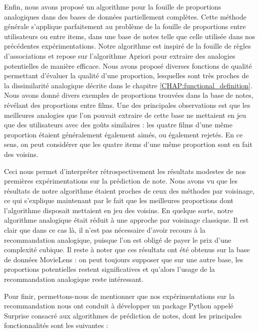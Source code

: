 Enfin, nous avons proposé un algorithme pour la fouille de proportions
analogiques dans des bases de données partiellement complètes. Cette méthode
générale s'applique parfaitement au problème de la fouille de proportions
entre utilisateurs ou entre items, dans une base de notes telle que
celle utilisée dans nos précédentes expérimentations. Notre algorithme est
inspiré de la fouille de règles d'associations et repose sur l'algorithme
Apriori pour extraire des analogies potentielles de manière efficace. Nous
avons proposé diverses fonctions de qualité permettant d'évaluer la qualité d'une
proportion, lesquelles sont très proches de la dissimilarité analogique décrite
dans le chapitre \ref{CHAP:functional_definition}. Nous avons donné divers
exemples de proportions trouvées dans la base de notes, révélant des
proportions entre films. Une des principales observations est que les meilleures
analogies que l'on pouvait extraire de cette base ne mettaient en jeu que des
utilisateurs avec des goûts similaires : les quatre films d'une même
proportion étaient généralement également aimés, ou également rejetés. En ce
sens, on peut considérer que les quatre items d'une même proportion sont en
fait des voisins.

Ceci nous permet d'interpréter rétrospectivement les résultats modestes de nos
premières expérimentations sur la prédiction de note. Nous avons vu que les
résultats de notre algorithme étaient proches de ceux des méthodes par
voisinage, ce qui s'explique maintenant par le fait que les meilleures
proportions dont l'algorithme disposait mettaient en jeu des voisins. En
quelque sorte, notre algorithme analogique était réduit à une approche par
voisinage classique. Il est clair que dans ce cas là, il  n'est pas nécessaire
d'avoir recours à la recommandation analogique, puisque l'on est obligé de
payer le prix d'une complexité cubique. Il reste à noter que ces résultats ont
été obtenus sur la base de données MovieLens : on peut toujours supposer que
sur une autre base, les proportions potentielles restent significatives et
qu'alors l'usage de la recommandation analogique reste intéressant.

Pour finir, permettons-nous de mentionner que nos expérimentations sur la
recommandation nous ont conduit à développer un package Python appelé Surprise
\cite{Surprise} consacré aux algorithmes de prédiction de notes, dont les
principales fonctionnalités sont les suivantes :

